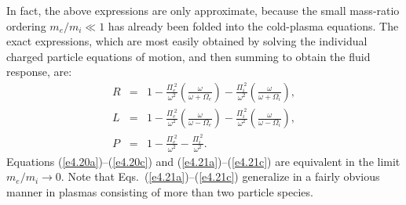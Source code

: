 In fact, the above expressions are only approximate, because the small
mass-ratio ordering $m_e/m_i\ll 1$ has already been folded into the
cold-plasma equations. The exact expressions, which are most easily
obtained by solving the individual charged particle equations
of motion, and then summing  to obtain the
fluid response, are:
\begin{eqnarray}\label{e4.21a}
R &=& 1 - \frac{{\Pi}_e^{~2}}{\omega^2}
\!\left(\frac{\omega}{\omega + {\Omega}_e}\right)
 -\frac{{\Pi}_i^{~2}}{\omega^2}\!
\left(\frac{\omega}{\omega + {\Omega}_i}\right),\\[0.5ex]
L &=& 1 - \frac{{\Pi}_e^{~2}}{\omega^2}\!
\left(\frac{\omega}{\omega -{\Omega}_e}\right)
 -\frac{{\Pi}_i^{~2}}{\omega^2}\!
\left(\frac{\omega}{\omega -{\Omega}_i}\right),\\[0.5ex]
P&=& 1 - \frac{{\Pi}_e^{~2}}{\omega^2}-\frac{{\Pi}_i^{~2}}{\omega^2}.\label{e4.21c}
\end{eqnarray}
Equations (\ref{e4.20a})--(\ref{e4.20c}) and (\ref{e4.21a})--(\ref{e4.21c}) are equivalent in the limit $m_e/m_i\rightarrow 0$. 
Note that Eqs.~(\ref{e4.21a})--(\ref{e4.21c}) generalize in a fairly obvious manner in plasmas
consisting of more than two particle species. 

